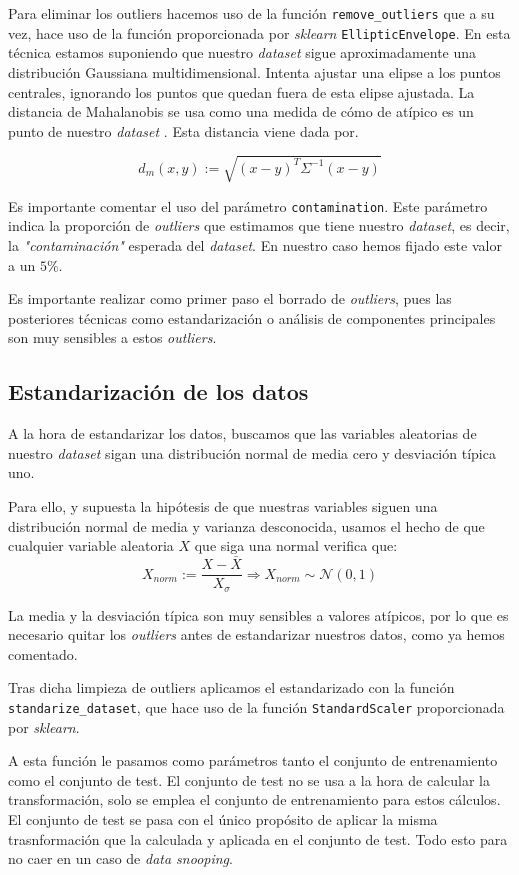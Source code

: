 \documentclass[11pt]{article}
\begin{document}
Para eliminar los outliers hacemos uso de la función \lstinline{remove_outliers} que a su vez, hace uso de la función proporcionada por \emph{sklearn} \lstinline{EllipticEnvelope}. En esta técnica estamos suponiendo que nuestro \emph{dataset} sigue aproximadamente una distribución Gaussiana multidimensional. Intenta ajustar una elipse a los puntos centrales, ignorando los puntos que quedan fuera de esta elipse ajustada. La distancia de Mahalanobis se usa como una medida de cómo de atípico es un punto de nuestro \emph{dataset} \cite{sklearn_outlier:online}. Esta distancia viene dada por.

$$d_m(x, y) := \sqrt{(x - y)^T \Sigma^{-1} (x - y)}$$

Es importante comentar el uso del parámetro \lstinline{contamination}. Este parámetro indica la proporción de \emph{outliers} que estimamos que tiene nuestro \emph{dataset}, es decir, la \emph{"contaminación"} esperada del \emph{dataset}. En nuestro caso hemos fijado este valor a un $5\%$.

Es importante realizar como primer paso el borrado de \emph{outliers}, pues las posteriores técnicas como estandarización o análisis de componentes principales son muy sensibles a estos \emph{outliers}.

\subsection{Estandarización de los datos}

A la hora de estandarizar los datos, buscamos que las variables aleatorias de nuestro \emph{dataset} sigan una distribución normal de media cero y desviación típica uno.

Para ello, y supuesta la hipótesis de que nuestras variables siguen una distribución normal de media y varianza desconocida, usamos el hecho de que cualquier variable aleatoria $X$ que siga una normal verifica que:
$$X_{norm} := \frac{{X- \bar{X}}}{X_{\sigma}} \Longrightarrow X_{norm} \sim \mathcal{N}(0, 1)$$

La media y la desviación típica son muy sensibles a valores atípicos, por lo que es necesario quitar los \emph{outliers} antes de estandarizar nuestros datos, como ya hemos comentado.

Tras dicha limpieza de outliers aplicamos el estandarizado con la función \lstinline{standarize_dataset}, que hace uso de la función \lstinline{StandardScaler} proporcionada por \emph{sklearn}.

A esta función le pasamos como parámetros tanto el conjunto de entrenamiento como el conjunto de test. El conjunto de test no se usa a la hora de calcular la transformación, solo se emplea el conjunto de entrenamiento para estos cálculos. El conjunto de test se pasa con el único propósito de aplicar la misma trasnformación que la calculada y aplicada en el conjunto de test. Todo esto para no caer en un caso de \emph{data snooping}.
\end{document}
